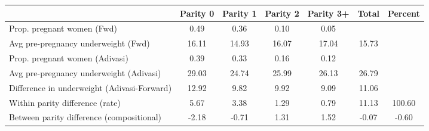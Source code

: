 \begin{tabular}{l*{6}{c}}
\toprule
            &\multicolumn{1}{c}{Parity 0}&\multicolumn{1}{c}{Parity 1}&\multicolumn{1}{c}{Parity 2}&\multicolumn{1}{c}{Parity 3+}&\multicolumn{1}{c}{Total}&\multicolumn{1}{c}{Percent}\\
\midrule
\midrule
Prop. pregnant women (Fwd)&        0.49&        0.36&        0.10&        0.05&            &            \\
Avg pre-pregnancy underweight (Fwd)&       16.11&       14.93&       16.07&       17.04&       15.73&            \\
Prop. pregnant women (Adivasi)&        0.39&        0.33&        0.16&        0.12&            &            \\
Avg pre-pregnancy underweight (Adivasi)&       29.03&       24.74&       25.99&       26.13&       26.79&            \\
Difference in underweight (Adivasi-Forward)&       12.92&        9.82&        9.92&        9.09&       11.06&            \\
Within parity difference (rate)&        5.67&        3.38&        1.29&        0.79&       11.13&      100.60\\
Between parity difference (compositional)&       -2.18&       -0.71&        1.31&        1.52&       -0.07&       -0.60\\
\bottomrule
\end{tabular}
